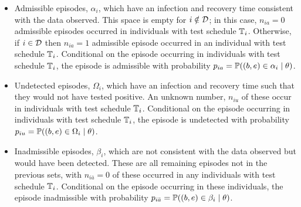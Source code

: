 \documentclass[thesis.tex]{subfiles}
\begin{document}
\begin{itemize}
\item
  Admissible episodes, $\alpha_i$, which have an infection and recovery time consistent with the data observed.
  This space is empty for $i \notin \mathcal{D}$; in this case, $n_{ia} = 0$ admissible episodes occurred in individuals with test schedule $\mathbb{T}_i$.
  Otherwise, if $i \in \mathcal{D}$ then $n_{ia} =1$ admissible episode occurred in an individual with test schedule $\mathbb{T}_{i}$.
  Conditional on the episode occurring in individuals with test schedule $\mathbb{T}_i$, the episode is admissible with probability $p_{ia} = \operatorname{\mathbb{P}}((b, e) \in \alpha_i \mid \theta)$.
  \label{perf-test:def:admissible}
\item
  Undetected episodes, $\Omega_i$, which have an infection and recovery time such that they would not have tested positive.
  An unknown number, $n_{iu}$ of these occur in individuals with test schedule $\mathbb{T}_i$.
  Conditional on the episode occurring in individuals with test schedule $\mathbb{T}_i$, the episode is undetected with probability $p_{iu} = \operatorname{\mathbb{P}}((b, e) \in \Omega_i \mid \theta)$.
\item
  Inadmissible episodes, $\beta_i$, which are not consistent with the data observed but would have been
  detected.
  These are all remaining episodes not in the previous sets, with $n_{i\bar{a}} = 0$ of these occurred in any individuals with test schedule $\mathbb{T}_i$.
  Conditional on the episode occurring in these individuals, the episode inadmissible with probability $p_{i\bar{a}} = \operatorname{\mathbb{P}}((b, e) \in \beta_i \mid \theta)$.
\end{itemize}
\end{document}
